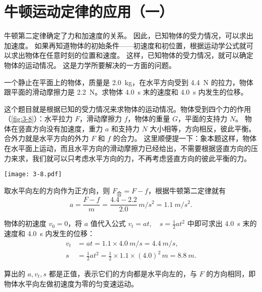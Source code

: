 \section{牛顿运动定律的应用（一）}
牛顿第二定律确定了力和加速度的关系。
因此，已知物体的受力情况，可以求出加速度。
如果再知道物体的初始条件——初速度和初位置，根据运动学公式就可以求出物体在任意时刻的位置和速度。
这样，已知物体的受力情况，就可以确定物体的运动情况。
这是力学所要解决的一方面的问题。

\begin{example}
一个静止在平面上的物体，质量是 \qty{2.0}{kg}，在水平方向受到 \qty{4.4}{N} 的拉力，物体跟平面的滑动摩擦力是 \qty{2.2}{N}。求物体 \qty{4.0}{s} 末的速度和 \qty{4.0}{s} 内发生的位移。
\end{example}

\smallskip\noindent
\begin{minipage}{0.7\linewidth}
  \begin{solution}
    这个题目就是根据已知的受力情况来求物体的运动情况。物体受到四个力的作用（\cref{fig:3-8}）：水平拉力 $F$，滑动摩擦力 $f$，物体的重量 $G$，平面的支持力 $N$。
    物体在竖直方向没有加速度，重力 $a$ 和支持力 $N$ 大小相等，方向相反，彼此平衡。
    合外力就是水平方向的外力 $F$ 和 $f$ 的合力。
    这里顺便提一下：象本题这样，物体在水平面上运动，而且水平方向的滑动摩擦力已经给出，不需要根据竖直方向的压力来求，我们就可以只考虑水平方向的力，不再考虑竖直方向的彼此平衡的力。
  \end{solution}
\end{minipage}\hfill
\begin{minipage}{0.28\linewidth}\centering
  \begin{figurehere}
    \texttt{[image: 3-8.pdf]}
    \caption{}\label{fig:3-8}
  \end{figurehere}
\end{minipage}

\bigskip
取水平向左的方向作为正方向，则 $F_\text{合}=F-f$，根据牛顿第二定律就有
\[a=\frac{F-f}{m}=\frac{4.4-2.2}{2.0}\,\unit{m/s^2} = \qty{1.1}{m/s^2}.\]
 
物体的初速度 $v_0=0$，将 $a$ 值代入公式 $v_t=at,\quad s=\frac{1}{2}at^2$ 中即可求出 \qty{4.0}{s} 末的速度和 \qty{4.0}{s} 内发生的位移：
\[\begin{split}
v_t&=at=1.1\times \qty{4.0}{m/s} = \qty{4.4}{m/s},\\
s&=\frac{1}{2}at^2=\frac{1}{2}\times 1.1\times (4.0)^2 \,\unit{m}=\qty{8.8}{m}.
\end{split} \]

算出的 $a,v_t,s$ 都是正值，表示它们的方向都是水平向左的，与 $F$ 的方向相同，即物体水平向左做初速度为零的匀变速运动。

